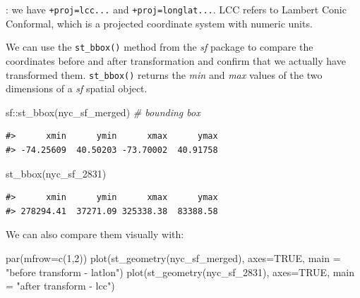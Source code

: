 \documentclass[
  11pt,
]{book}
\newenvironment{Shaded}{\begin{snugshade}}{\end{snugshade}}
\newcommand{\AttributeTok}[1]{\textcolor[rgb]{0.77,0.63,0.00}{#1}}
\newcommand{\CommentTok}[1]{\textcolor[rgb]{0.56,0.35,0.01}{\textit{#1}}}
\newcommand{\ConstantTok}[1]{\textcolor[rgb]{0.00,0.00,0.00}{#1}}
\newcommand{\DecValTok}[1]{\textcolor[rgb]{0.00,0.00,0.81}{#1}}
\newcommand{\FunctionTok}[1]{\textcolor[rgb]{0.00,0.00,0.00}{#1}}
\newcommand{\NormalTok}[1]{#1}
\newcommand{\SpecialCharTok}[1]{\textcolor[rgb]{0.00,0.00,0.00}{#1}}
\newcommand{\StringTok}[1]{\textcolor[rgb]{0.31,0.60,0.02}{#1}}
\begin{document}
: we have \texttt{+proj=lcc...} and \texttt{+proj=longlat...}. LCC refers to Lambert Conic Conformal, which is a projected coordinate system with numeric units.

We can use the \texttt{st\_bbox()} method from the \emph{sf} package to compare the coordinates before and after transformation and confirm that we actually have transformed them. \texttt{st\_bbox()} returns the \emph{min} and \emph{max} values of the two dimensions of a \emph{sf} spatial object.

\begin{Shaded}
\begin{Highlighting}[]
\NormalTok{sf}\SpecialCharTok{::}\FunctionTok{st\_bbox}\NormalTok{(nyc\_sf\_merged) }\CommentTok{\# bounding box}
\end{Highlighting}
\end{Shaded}

\begin{verbatim}
#>      xmin      ymin      xmax      ymax 
#> -74.25609  40.50203 -73.70002  40.91758
\end{verbatim}

\begin{Shaded}
\begin{Highlighting}[]
\FunctionTok{st\_bbox}\NormalTok{(nyc\_sf\_2831)}
\end{Highlighting}
\end{Shaded}

\begin{verbatim}
#>      xmin      ymin      xmax      ymax 
#> 278294.41  37271.09 325338.38  83388.58
\end{verbatim}

We can also compare them visually with:

\begin{Shaded}
\begin{Highlighting}[]
\FunctionTok{par}\NormalTok{(}\AttributeTok{mfrow=}\FunctionTok{c}\NormalTok{(}\DecValTok{1}\NormalTok{,}\DecValTok{2}\NormalTok{)) }
\FunctionTok{plot}\NormalTok{(}\FunctionTok{st\_geometry}\NormalTok{(nyc\_sf\_merged), }\AttributeTok{axes=}\ConstantTok{TRUE}\NormalTok{, }\AttributeTok{main =} \StringTok{"before transform {-} latlon"}\NormalTok{)}
\FunctionTok{plot}\NormalTok{(}\FunctionTok{st\_geometry}\NormalTok{(nyc\_sf\_2831), }\AttributeTok{axes=}\ConstantTok{TRUE}\NormalTok{, }\AttributeTok{main =} \StringTok{"after transform {-} lcc"}\NormalTok{)}
\end{Highlighting}
\end{Shaded}
\end{document}
